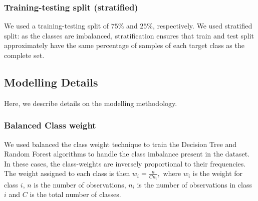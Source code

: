 \documentclass[sigconf]{acmart}
\begin{document}

\subsubsection{Training-testing split (stratified)} We used a training-testing split of $75\%$ and $25\%$, respectively. We used stratified split: as the classes are imbalanced, stratification ensures that train and test split approximately have the same percentage of samples of each target class as the complete set.

\subsection{Modelling Details}
Here, we describe details on the modelling methodology.

\subsubsection{Balanced Class weight} We used balanced the class weight technique to train the Decision Tree and Random Forest algorithms to handle the class imbalance present in the dataset. In these cases, the class-weights are inversely proportional to their frequencies. The weight assigned to each class is then $w_i=\frac{n}{C n_i},$
where $w_i$ is the weight for class $i$, $n$ is the number of observations, $n_i$ is the number of observations in class $i$ and $C$ is the total number of classes.
 
\end{document}
